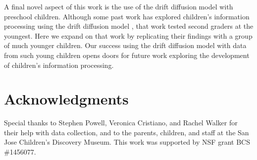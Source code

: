 \documentclass[man, noapacite]{apa2}
\begin{document}
A final novel aspect of this work is the use of the drift diffusion model with preschool children. Although some past work has explored children's information processing using the drift diffusion model \cite{ratcliff2012}, that work tested second graders at the youngest. Here we expand on that work by replicating their findings with a group of much younger children. Our success using the drift diffusion model with data from such young children opens doors for future work exploring the development of children's information processing.

\section{Acknowledgments}
%
Special thanks to Stephen Powell, Veronica Cristiano, and Rachel Walker for their help with data collection, and to the parents, children, and staff at the San Jose Children's Discovery Museum. This work was supported by NSF grant BCS \#1456077.




\setlength{\bibleftmargin}{.125in}
\setlength{\bibindent}{-\bibleftmargin}


\end{document}
